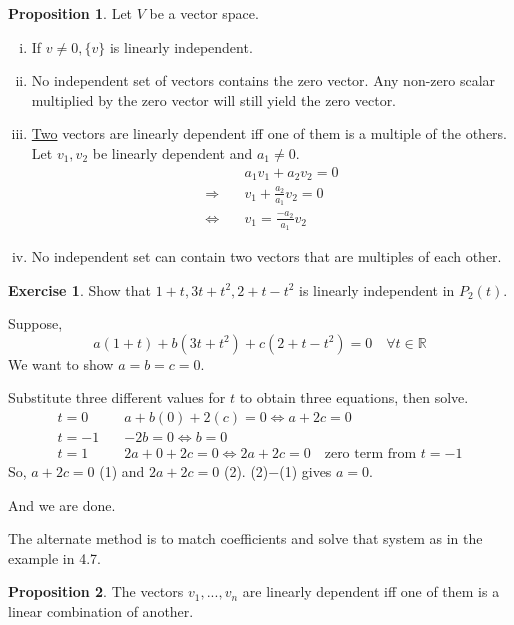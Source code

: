 \documentclass{report}
\theoremstyle{definition}
\newtheorem{_exc}{Exercise}
\newtheorem{_prop}{Proposition}
\begin{document}
\begin{_prop}
Let $V$ be a vector space.
\begin{enumerate}[i)]
 \item If $v\neq 0, \{v\}$ is linearly independent.
 \item No independent set of vectors contains the zero vector.
 Any non-zero scalar multiplied by the zero vector will still yield the zero vector.
 \item \underline{Two} vectors are linearly dependent iff one of them is a multiple of the others.
 Let $v_1, v_2$ be linearly dependent and $a_1\neq 0$.
 \begin{align*}
 &a_1v_1+a_2v_2=0 \\
 \Rightarrow \quad & v_1+\frac{a_2}{a_1}v_2=0 \\
 \Leftrightarrow \quad & v_1=\frac{-a_2}{a_1}v_2
 \end{align*}
 \item No independent set can contain two vectors that are multiples of each other.
\end{enumerate}
\end{_prop}

\begin{_exc}
Show that ${1+t,3t+t^2,2+t-t^2}$ is linearly independent in $P_2(t)$.

Suppose,
\[a(1+t)+b(3t+t^2)+c(2+t-t^2)=0\quad \forall t\in \mathbb{R}\]
We want to show $a=b=c=0$.

Substitute three different values for $t$ to obtain three equations, then solve.
\begin{align*}
t=0\quad & a+b(0)+2(c)=0\Leftrightarrow a+2c=0\\
t=-1\quad & -2b=0\Leftrightarrow b=0\\
t=1\quad & 2a+0+2c=0\Leftrightarrow 2a+2c=0\quad \text{zero term from }t=-1
\end{align*}
So, $a+2c=0$ (1) and $2a+2c=0$ (2).
(2)$-$(1) gives $a=0$.

And we are done.

The alternate method is to match coefficients and solve that system as in the example in 4.7.
\end{_exc}

\begin{_prop}
The vectors $v_1,...,v_n$ are linearly dependent iff one of them is a linear combination of another.
\end{_prop}
\end{document}
